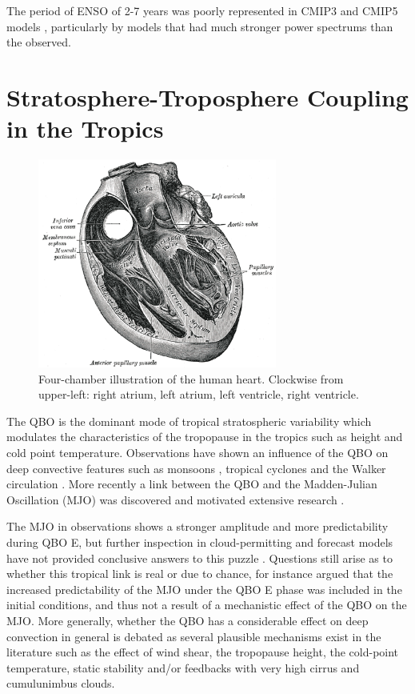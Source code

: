 The period of ENSO of 2-7 years \citep{neelin1998,wang2004} was poorly represented in CMIP3 and CMIP5 models \citep{guilyardi2009}, particularly by models that had much stronger power spectrums than the observed.



\section{Stratosphere-Troposphere Coupling in the Tropics}

\begin{figure}
\centering\includegraphics[width=0.7\textwidth]{figures/sample/Gray498.png} 
\caption[Four-chamber illustration of the human heart.]{Four-chamber illustration of the human heart.  Clockwise from upper-left: right atrium, left atrium, left ventricle, right ventricle.}
\label{fig:fourchamber}\end{figure}

The QBO is the dominant mode of tropical stratospheric variability which  modulates the characteristics of the tropopause in the tropics \citep{baldwin2001,tegtmeier2020} such as height and cold point temperature. 
Observations have shown an influence of the QBO on deep convective features such as monsoons \citep{giorgetta1999}, tropical cyclones \citep{chan1995} and the Walker circulation \citep{collimore2003}. More recently a link between the QBO and the Madden-Julian Oscillation (MJO) was discovered \citep{son2017} and motivated extensive research \citep[see e.g.][]{lee2018,wang2019,martin2020jgr}.

 The MJO in observations shows a stronger amplitude and more predictability during QBO E, but further inspection in cloud-permitting and forecast models have not provided conclusive answers to this puzzle \citep{martin2019,martin2020jgr}. Questions still arise as to whether this tropical link is real or due to chance, for instance \cite{wang2019} argued that the increased predictability of the MJO under the QBO E phase was included in the initial conditions, and thus not a result of a mechanistic effect of the QBO on the MJO. More generally, whether the QBO has a considerable effect on deep convection in general is debated as several plausible mechanisms exist in the literature \citep[see e.g.][]{nie2015} such as the effect of wind shear, the tropopause height, the cold-point temperature, static stability and/or feedbacks with very high cirrus and cumulunimbus clouds. 

